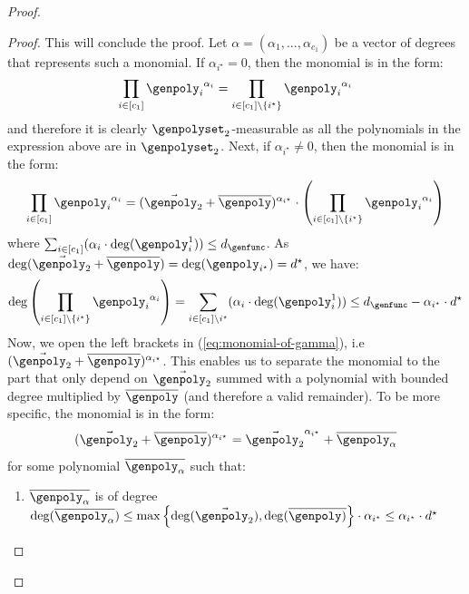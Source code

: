 \documentclass[10pt,a4paper]{article}
\newcommand{\parens}[1]{\left( #1 \right)}
\newcommand{\set}[1]{\left\{ #1 \right\}}
\newcommand{\degree}[0]{d}
\newcommand{\relativeremainder}[1]{\overline{#1}}
\begin{document}
\begin{proof}
\begin{proof}
        This will conclude the proof.
        \newline
        Let $\alpha = (\alpha_1,...,\alpha_{c_1})$ be a vector of degrees that represents such a monomial.
        If $\alpha_{i^\star} = 0$, then the monomial is in the form:
        \[
            \prod_{i \in [c_1]}{{\genpoly_i}^{\alpha_i}} =
            \prod_{i \in [c_1] \setminus \set{i^{\star}}}{{\genpoly_i}^{\alpha_i}}
        \]
        and therefore it is clearly $\genpolyset_2$-measurable as all the polynomials in the expression above are in $\genpolyset_2$.
        \newline
        Next, if $\alpha_{i^\star} \neq 0$, then the monomial is in the form:
       \begin{equation} \label{eq:monomial-of-gamma}
            \prod_{i \in [c_1]}{{\genpoly_i}^{\alpha_i}} =
            (\vec{\genpoly_2} + \relativeremainder{\genpoly})^{\alpha_{i^\star}} \cdot
                \parens{\prod_{i \in [c_1] \setminus \set{i^{\star}}}{{\genpoly_i}^{\alpha_i}}}
       \end{equation}
        where $\sum_{i \in [c_1]}(\alpha_i \cdot \deg(\genpoly_i^1)) \leq \degree_{\genfunc}$.
        As $\deg(\vec{\genpoly_2} + \relativeremainder{\genpoly}) = \deg(\genpoly_{i^\star}) =\degree^{\star}$, we have:
        \[
            \deg \parens{\prod_{i \in [c_1] \setminus \set{i^{\star}}}{{\genpoly_i}^{\alpha_i}}} =
                \sum_{i \in [c_1] \setminus {i^{\star}}}(\alpha_i \cdot \deg(\genpoly_i^1))
                \leq \degree_{\genfunc} - \alpha_{i^\star} \cdot \degree^{\star}
        \]
        Now, we open the left brackets in (\ref{eq:monomial-of-gamma}), i.e $(\vec{\genpoly_2} + \relativeremainder{\genpoly})^{\alpha_{i^\star}}$.
        This enables us to separate the monomial to the part that only depend on $\vec{\genpoly_2}$ summed with a polynomial with bounded degree multiplied by $\relativeremainder{\genpoly}$ (and therefore a valid remainder).
        To be more specific, the monomial is in the form:
        \[
            (\vec{\genpoly_2} + \relativeremainder{\genpoly})^{\alpha_{i^\star}} = \vec{\genpoly_2}^{\alpha_{i^\star}} + \relativeremainder{\genpoly_{\alpha}}
        \]
        for some polynomial $\relativeremainder{\genpoly_{\alpha}}$ such that:
        \begin{enumerate}
            \item $\relativeremainder{\genpoly_{\alpha}}$ is of degree
                    $\deg(\relativeremainder{\genpoly_{\alpha}}) \leq \max \set{\deg(\vec{\genpoly_2}), \deg(\relativeremainder{\genpoly)}} \cdot \alpha_{i^\star} \leq \alpha_{i^\star} \cdot \degree^{\star}$

\end{enumerate}
\end{proof}
\end{proof}
\end{document}
